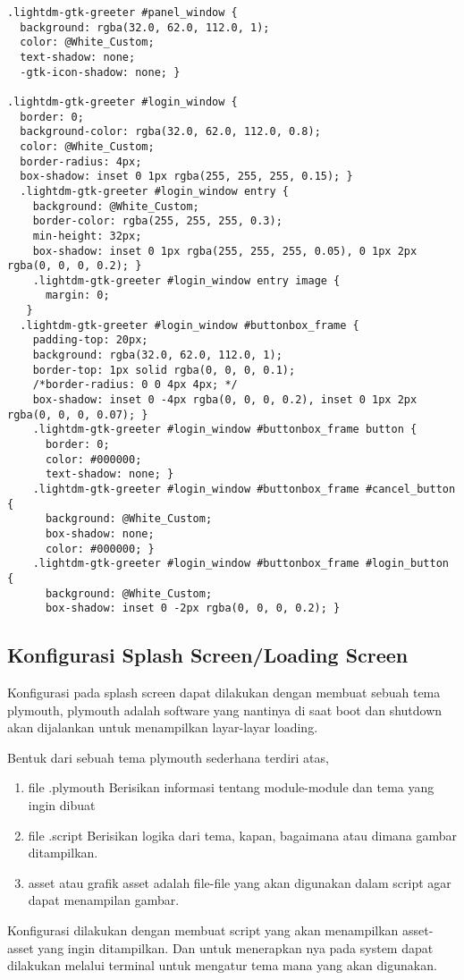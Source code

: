 \documentclass[8pt, a4paper]{article}
\begin{document}
\begin{multicols}{2}
\begin{lstlisting}
.lightdm-gtk-greeter #panel_window {
  background: rgba(32.0, 62.0, 112.0, 1);
  color: @White_Custom;
  text-shadow: none;
  -gtk-icon-shadow: none; }

.lightdm-gtk-greeter #login_window {
  border: 0;
  background-color: rgba(32.0, 62.0, 112.0, 0.8);
  color: @White_Custom;
  border-radius: 4px;
  box-shadow: inset 0 1px rgba(255, 255, 255, 0.15); }
  .lightdm-gtk-greeter #login_window entry {
    background: @White_Custom;
    border-color: rgba(255, 255, 255, 0.3);
    min-height: 32px;
    box-shadow: inset 0 1px rgba(255, 255, 255, 0.05), 0 1px 2px rgba(0, 0, 0, 0.2); }
    .lightdm-gtk-greeter #login_window entry image {
      margin: 0;
   }
  .lightdm-gtk-greeter #login_window #buttonbox_frame {
    padding-top: 20px;
    background: rgba(32.0, 62.0, 112.0, 1);
    border-top: 1px solid rgba(0, 0, 0, 0.1);
    /*border-radius: 0 0 4px 4px; */
    box-shadow: inset 0 -4px rgba(0, 0, 0, 0.2), inset 0 1px 2px rgba(0, 0, 0, 0.07); }
    .lightdm-gtk-greeter #login_window #buttonbox_frame button {
      border: 0;
      color: #000000;
      text-shadow: none; }
    .lightdm-gtk-greeter #login_window #buttonbox_frame #cancel_button {
      background: @White_Custom;
      box-shadow: none;
      color: #000000; }
    .lightdm-gtk-greeter #login_window #buttonbox_frame #login_button {
      background: @White_Custom;
      box-shadow: inset 0 -2px rgba(0, 0, 0, 0.2); }
\end{lstlisting}
\end{multicols}

\newpage

\subsection{Konfigurasi Splash Screen/Loading Screen}

Konfigurasi pada splash screen dapat dilakukan dengan membuat sebuah tema
plymouth, plymouth adalah software yang nantinya di saat boot dan shutdown
akan dijalankan untuk menampilkan layar-layar loading.

Bentuk dari sebuah tema plymouth sederhana terdiri atas,

\begin{enumerate}
  \item file .plymouth
    Berisikan informasi tentang module-module dan tema yang ingin dibuat

  \item file .script
    Berisikan logika dari tema, kapan, bagaimana atau dimana gambar ditampilkan.

  \item asset atau grafik
    asset adalah file-file yang akan digunakan dalam script agar dapat menampilan
    gambar.

\end{enumerate}

Konfigurasi dilakukan dengan membuat script yang akan menampilkan asset-asset yang
ingin ditampilkan. Dan untuk menerapkan nya pada system dapat dilakukan melalui
terminal untuk mengatur tema mana yang akan digunakan.
\end{document}
